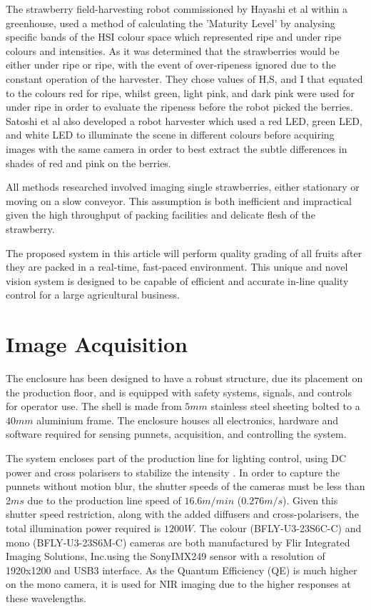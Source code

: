 \documentclass[fleqn,twoside,12pt]{report}
\begin{document}
The strawberry field-harvesting robot commissioned by Hayashi et al \cite{hayashi} within a greenhouse, used a method of calculating the 'Maturity Level' by analysing specific bands of the HSI colour space which represented ripe and under ripe colours and intensities. As it was determined that the strawberries would be either under ripe or ripe, with the event of over-ripeness ignored due to the constant operation of the harvester. They chose values of H,S, and I that equated to the colours red for ripe, whilst green, light pink, and dark pink were used for under ripe in order to evaluate the ripeness before the robot picked the berries. Satoshi et al \cite{yamamoto2} also developed a robot harvester which used a red LED, green LED, and white LED to illuminate the scene in different colours before acquiring images with the same camera in order to best extract the subtle differences in shades of red and pink on the berries. 

All methods researched involved imaging single strawberries, either stationary or moving on a slow conveyor. This assumption is both inefficient and impractical given the high throughput of packing facilities and delicate flesh of the strawberry.

The proposed system in this article will perform quality grading of all fruits after they are packed in a real-time, fast-paced environment. This unique and novel vision system is designed to be capable of efficient and accurate in-line quality control for a large agricultural business.   



\section{Image Acquisition}

The enclosure has been designed to have a robust structure, due its placement on the production floor, and is equipped with safety systems, signals, and controls for operator use. The shell is made from $5mm$ stainless steel sheeting bolted to a $40mm$ aluminium frame. The enclosure houses all electronics, hardware and software required for sensing punnets, acquisition, and controlling the system.

The system encloses part of the production line for lighting control, using DC power and cross polarisers to stabilize the intensity \cite{eaton}. In order to capture the punnets without motion blur, the shutter speeds of the cameras must be less than $2ms$ due to the production line speed of $16.6m/min$ ($0.276m/s$). Given this shutter speed restriction, along with the added diffusers and cross-polarisers, the total illumination power required is $1200W$. The colour (BFLY-U3-23S6C-C) and mono (BFLY-U3-23S6M-C) cameras are both manufactured by Flir Integrated Imaging Solutions, Inc.\textregistered using the Sony\textregistered IMX249 sensor with a resolution of 1920x1200 and USB3 interface. As the Quantum Efficiency (QE) is much higher on the mono camera, it is used for NIR imaging due to the higher responses at these wavelengths.
\end{document}
